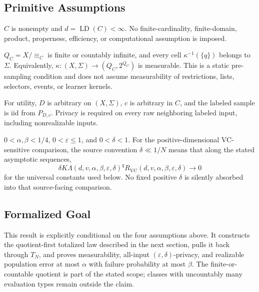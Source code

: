 \subsection{Primitive Assumptions}
\begin{assumption}\label{assump:finite-littlestone}
$C$ is nonempty and $d=\operatorname{LD}(C)<\infty$.  No finite-cardinality,
finite-domain, product, properness, efficiency, or computational assumption
is imposed.
\end{assumption}

\begin{assumption}\label{assump:countable-evaluation-quotient}
$Q_C=X/{\equiv_C}$ is finite or countably infinite, and every cell
$\kappa^{-1}(\{q\})$ belongs to $\Sigma$.  Equivalently,
$\kappa:(X,\Sigma)\to(Q_C,2^{Q_C})$ is measurable.  This is a static
pre-sampling condition and does not assume measurability of restrictions,
lists, selectors, events, or learner kernels.
\end{assumption}

\begin{assumption}\label{assump:realizable-iid}
For utility, $D$ is arbitrary on $(X,\Sigma)$, $c$ is arbitrary in $C$,
and the labeled sample is iid from $P_{D,c}$.  Privacy is required on every
raw neighboring labeled input, including nonrealizable inputs.
\end{assumption}

\begin{assumption}\label{assump:approximate-dp-regime}
$0<\alpha,\beta<1/4$, $0<\varepsilon\le1$, and $0<\delta<1$.  For the
positive-dimensional VC-sensitive comparison, the source convention
$\delta\ll1/N$ means that along the stated asymptotic sequences,
\[
 \delta K\Lambda(d,v,\alpha,\beta,\varepsilon,\delta)^q
 R_{\mathrm{VC}}(d,v,\alpha,\beta,\varepsilon,\delta)\longrightarrow0
\]
for the universal constants used below.  No fixed positive
$\delta$ is silently absorbed into that source-facing comparison.
\end{assumption}

\subsection{Formalized Goal}
This result is explicitly conditional on the four assumptions above.  It
constructs the quotient-first totalized law described in the next section,
pulls it back through $T_N$, and proves measurability, all-input
$(\varepsilon,\delta)$-privacy, and realizable population error at most
$\alpha$ with failure probability at most $\beta$.  The finite-or-countable
quotient is part of the stated scope; classes with uncountably many
evaluation types remain outside the claim.

